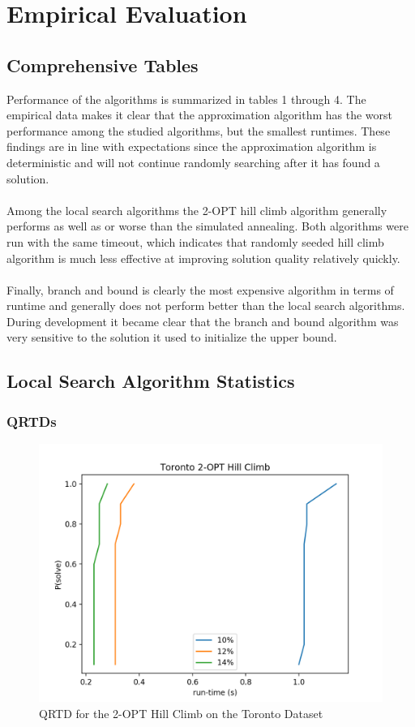 \documentclass[format=sigconf]{acmart}
\begin{document}
\section{Empirical Evaluation}
\subsection{Comprehensive Tables}
Performance of the algorithms is summarized in tables 1 through 4. The empirical data makes it clear that the approximation algorithm has the worst performance among the studied algorithms, but the smallest runtimes. These findings are in line with expectations since the approximation algorithm is deterministic and will not continue randomly searching after it has found a solution.\\
\\
Among the local search algorithms the 2-OPT hill climb algorithm generally  performs as well as or worse than the simulated annealing. Both algorithms were run with the same timeout, which indicates that randomly seeded hill climb algorithm is much less effective at improving solution quality relatively quickly.\\
\\
Finally, branch and bound is clearly the most expensive algorithm in terms of runtime and generally does not perform better than the local search algorithms. During development it became clear that the branch and bound algorithm was very sensitive to the solution it used to initialize the upper bound.
 
 
 
 
\newpage
\subsection{Local Search Algorithm Statistics}
\subsubsection{QRTDs}
\begin{figure}[htbp]
    \centerline{\includegraphics[scale=.5]{graphs/Toronto_LS1_QRTD.png}}
    \caption{QRTD for the 2-OPT Hill Climb on the Toronto Dataset}
    \label{fig:1}
\end{figure}
\end{document}
